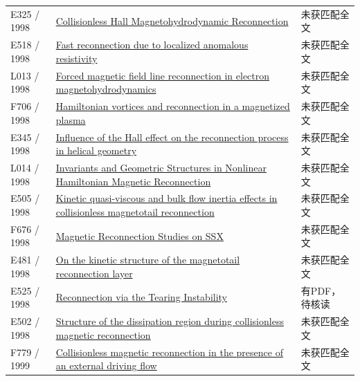 \begin{longtable}{P{24mm}P{97mm}P{27mm}}
E325 / 1998 & \href{http://ui.adsabs.harvard.edu/abs/1998APS..DPP.K6S43M/abstract}{Collisionless Hall Magnetohydrodynamic Reconnection} & 未获匹配全文\\

E518 / 1998 & \href{https://doi.org/10.1063/1.873046}{Fast reconnection due to localized anomalous resistivity} & 未获匹配全文\\

L013 / 1998 & \href{https://doi.org/10.1063/1.873005}{Forced magnetic field line reconnection in electron magnetohydrodynamics} & 未获匹配全文\\

F706 / 1998 & \href{https://doi.org/10.1017/s0022377898006655}{Hamiltonian vortices and reconnection in a magnetized plasma} & 未获匹配全文\\

E345 / 1998 & \href{http://ui.adsabs.harvard.edu/abs/1998PlPhR..24..929Z/abstract}{Influence of the Hall effect on the reconnection process in helical geometry} & 未获匹配全文\\

L014 / 1998 & \href{https://doi.org/10.1103/physrevlett.80.4430}{Invariants and Geometric Structures in Nonlinear Hamiltonian Magnetic Reconnection} & 未获匹配全文\\

E505 / 1998 & \href{https://doi.org/10.1029/97ja02699}{Kinetic quasi‐viscous and bulk flow inertia effects in collisionless magnetotail reconnection} & 未获匹配全文\\

F676 / 1998 & \href{https://works.swarthmore.edu/theses/680}{Magnetic Reconnection Studies on SSX} & 未获匹配全文\\

E481 / 1998 & \href{https://doi.org/10.1029/98gl52510}{On the kinetic structure of the magnetotail reconnection layer} & 未获匹配全文\\

E525 / 1998 & \href{https://doi.org/10.48550/arxiv.astro-ph/9804166}{Reconnection via the Tearing Instability} & 有PDF，待核读\\

E502 / 1998 & \href{https://doi.org/10.1029/97ja03528}{Structure of the dissipation region during collisionless magnetic reconnection} & 未获匹配全文\\

F779 / 1999 & \href{https://doi.org/10.1017/s0022377899007497}{Collisionless magnetic reconnection in the presence of an external driving flow} & 未获匹配全文\\


\end{longtable}
